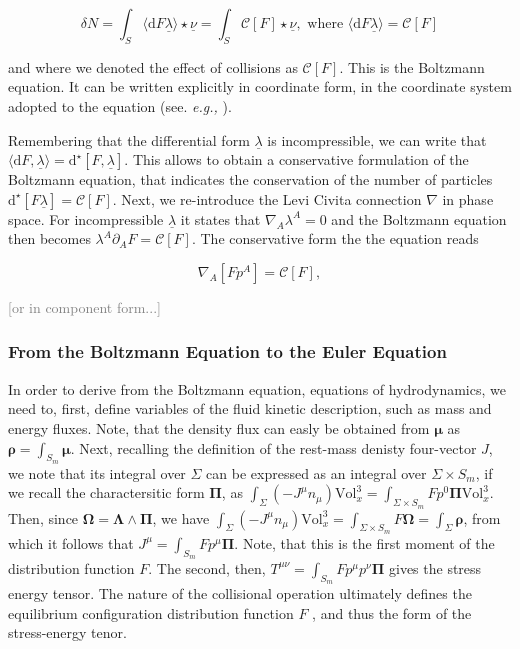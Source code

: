 \documentclass[11pt,a4paper,headinclude=true,DIV=14,BCOR=8mm,chapterprefix,listof=totoc,twoside,openright,abstracton]{scrbook}
\newcommand{\gray}[1]{\textcolor{gray}{#1}}
\begin{document}
\begin{equation}
\delta N = \int_S\langle\text{d}F\underline{\lambda}\rangle\star\underline{\nu} = \int_S\mathcal{C}[F]\star\underline{\nu}, \text{ where } \langle\text{d}F\underline{\lambda}\rangle = \mathcal{C}[F]
\end{equation}

and where we denoted the effect of collisions as $\mathcal{C}[F]$. This is the Boltzmann equation. It can be written explicitly in coordinate form, in the coordinate system adopted to the equation (see. \textit{e.g.,} \cite{Cercignani:2002}). 

Remembering that the differential form $\underline{\lambda}$ is incompressible, we can write that $\langle\text{d}F,\underline{\lambda}\rangle = \text{d}^{\star}[F,\underline{\lambda}]$. This allows to obtain a conservative formulation of the Boltzmann equation, that indicates the conservation of the number of particles \cite{Cardall:2002bp} $\text{d}^{\star}[F\underline{\lambda}] = \mathcal{C}[F]$. Next, we re-introduce the Levi Civita connection $\nabla$ in phase space. For incompressible $\underline{\lambda}$ it states that $\nabla_A\lambda^A=0$ and the Boltzmann equation then becomes $\lambda^A\partial_A F=\mathcal{C}[F]$. The conservative form the the equation reads 

\begin{equation}
\nabla_A[Fp^{A}] = \mathcal{C}[F],
\label{eq:theory:liouvilletheorem}
\end{equation}

\gray{[or in component form...]}

\subsubsection{From the Boltzmann Equation to the Euler Equation}

In order to derive from the Boltzmann equation, equations of hydrodynamics, we need to, first, define variables of the fluid kinetic description, such as mass and energy fluxes. Note, that the density flux can easly be obtained from $\boldsymbol{\mu}$ as $\boldsymbol{\rho} = \int_{S_m} \boldsymbol{\mu}$. Next, recalling the definition of the rest-mass denisty four-vector $J$, we note that its integral over $\Sigma$ can be expressed as an integral over $\Sigma\times S_{m}$, if we recall the charactersitic form $\boldsymbol{\Pi}$, as $\int_{\Sigma}(-J^{\mu}n_{\mu})\text{Vol}_x ^3 = \int_{\Sigma\times S_{m}} Fp^0\boldsymbol{\Pi}\text{Vol}_x ^3$. Then, since $\boldsymbol{\Omega} = \boldsymbol{\Lambda} \wedge \boldsymbol{\Pi}$, we have $\int_{\Sigma}(-J^{\mu}n_{\mu})\text{Vol}_x ^3 = \int_{\Sigma\times S_{m}} F\boldsymbol{\Omega} = \int_{\Sigma}\boldsymbol{\rho}$, from which it follows that $J^{\mu} = \int_{S_m}Fp^{\mu}\boldsymbol{\Pi}$. Note, that this is the first moment of the distribution function $F$. The second, then, $T^{\mu\nu} = \int_{S_m} F p^{\mu}p^{\nu}\boldsymbol{\Pi}$ gives the stress energy tensor. The nature of the collisional operation ultimately defines the equilibrium configuration distribution function $F$ \cite{Cercignani:2002}, and thus the form of the stress-energy tenor.
\end{document}
